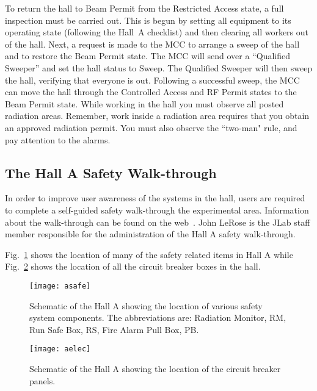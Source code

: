 To return the hall to Beam Permit from the Restricted Access state, a
full inspection must be carried out. This is begun by setting all
equipment to its operating state (following the Hall~A checklist) and
then clearing all workers out of the hall. Next, a request is made to
the MCC to arrange a sweep of the hall and to restore the Beam Permit
state. The MCC will send over a ``Qualified Sweeper'' and set the hall status to Sweep.
The Qualified Sweeper will then sweep the hall, verifying that everyone is
out. Following a successful sweep, the MCC can move the hall through
the Controlled Access and RF Permit states to the Beam Permit state.
While working in the hall you must observe all posted radiation areas.
Remember, work inside a radiation area requires that you obtain an
approved radiation permit. You must also observe the ``two-man" rule,
and pay attention to the alarms.

\begin{safetyen}{10}{10}
\subsection{The Hall A Safety Walk-through}
\end{safetyen}

In order to improve user awareness of the systems in the hall,
users are required to complete a self-guided safety walk-through
the experimental area. Information about the walk-through can be
found on the web~\cite{SAThalla}.
John LeRose is the JLab staff member responsible for the
administration of the Hall A safety walk-through.

Fig.~\ref{fig:asafe} shows the location of
many of the safety related items in Hall A while
Fig.~\ref{fig:aelec} shows the location of all the circuit
breaker boxes in the hall.

\begin{figure}
\begin{center}
\texttt{[image: asafe]}
{\linespread{1.}
\caption[Introduction: Location of Hall Safety Items ]{Schematic
of the Hall A showing the location of various safety system
components. The abbreviations are: Radiation Monitor, RM, Run
Safe Box, RS, Fire Alarm Pull Box, PB. }
\label{fig:asafe}}
\end{center}
\end{figure}

\begin{figure}
\begin{center}
\texttt{[image: aelec]}
{\linespread{1.}
\caption[Introduction: Location of Circuit Breakers]{Schematic of
the Hall A showing the location of the circuit breaker panels.}
\label{fig:aelec}}
\end{center}
\end{figure}


